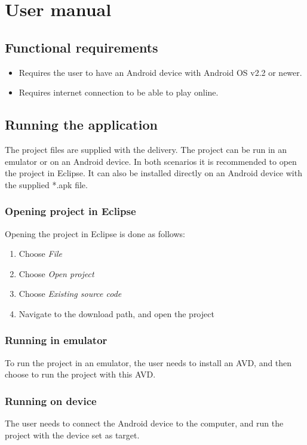\section{User manual}

\subsection{Functional requirements}
\begin{itemize}
\item Requires the user to have an Android device with Android OS v2.2 or newer.
\item Requires internet connection to be able to play online.
\end{itemize}

\subsection{Running the application}
The project files are supplied with the delivery. The project can be run in an emulator or on an Android device. In both scenarios it is recommended to open the project in Eclipse. It can also be installed directly on an Android device with the supplied *.apk file.

\subsubsection{Opening project in Eclipse}
Opening the project in Eclipse is done as follows:
\begin{enumerate}
\item Choose \emph{File}
\item Choose \emph{Open project}
\item Choose \emph{Existing source code}
\item Navigate to the download path, and open the project
\end{enumerate}

\subsubsection{Running in emulator}
To run the project in an emulator, the user needs to install an AVD, and then choose to run the project with this AVD.

\subsubsection{Running on device}
The user needs to connect the Android device to the computer, and run the project with the device set as target.

